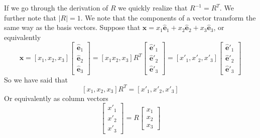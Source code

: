 \documentclass[a4paper]{article}
\begin{document}
If we go through the derivation of $R$ we quickly realize that $R^{-1} = R^T$. We further note that $|R| = 1$. We note that the components of a vector transform the same way as the basis vectors. Suppose that $\mathbf{x} = x_1\hat{\mathbf{e}}_1 + x_2\hat{\mathbf{e}}_2 + x_3\hat{\mathbf{e}}_3$, or equivalently
\[
    \mathbf{x} = [x_1, x_2, x_3]
    \begin{bmatrix}
        \hat{\mathbf{e}}_1 \\
        \hat{\mathbf{e}}_2 \\
        \hat{\mathbf{e}}_3
    \end{bmatrix}
    = [x_1 x_2, x_3]
    R^T
    \begin{bmatrix}
        \hat{\mathbf{e}}'_1 \\
        \hat{\mathbf{e}}'_2 \\
        \hat{\mathbf{e}}'_3
    \end{bmatrix}
    = [x'_1, x'_2, x'_3]
    \begin{bmatrix}
        \hat{\mathbf{e}}'_1 \\
        \hat{\mathbf{e}}'_2 \\
        \hat{\mathbf{e}}'_3
    \end{bmatrix}
\]
So we have said that
\[
    [x_1, x_2, x_3]R^T = 
    [x'_1, x'_2, x'_3]
\]
Or equivalently as column vectors
\[
    \begin{bmatrix}
        x'_1 \\
        x'_2 \\
        x'_3
    \end{bmatrix}
    = R
    \begin{bmatrix}
        x_1 \\
        x_2 \\
        x_3
    \end{bmatrix}
\]
\end{document}

